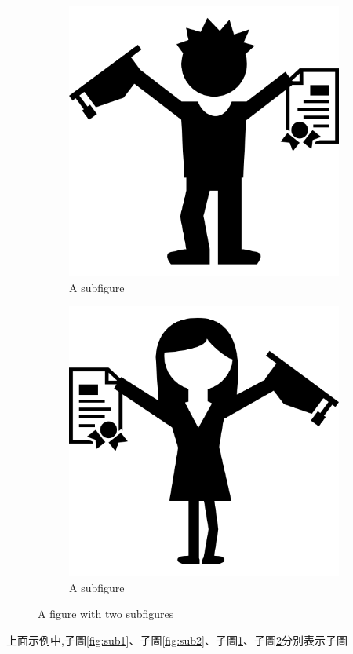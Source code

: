 \begin{figure}[H]
	\begin{subfigure}{.49\textwidth}
		\centering
		\includegraphics[width=.5\linewidth]{figure/eg05}
		\caption{A subfigure}
		\label{fig:sub3}
	\end{subfigure}
	\begin{subfigure}{.49\textwidth}
		\centering
		\includegraphics[width=.5\linewidth]{figure/eg06}
		\caption{A subfigure}
		\label{fig:sub4}
	\end{subfigure}
	\caption{A figure with two subfigures}
	\label{fig:sub}
\end{figure}
	
	
上面示例中,子圖\ref{fig:sub1}、子圖\ref{fig:sub2}、子圖\ref{fig:sub3}、子圖\ref{fig:sub4}分別表示子圖

	
	
